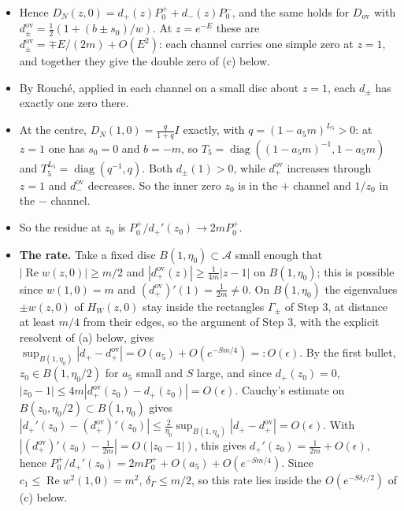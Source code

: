 \documentclass[11pt,a4paper]{article}
\begin{document}
\begin{itemize}
\begin{itemize}
\begin{itemize}
\begin{itemize}
\begin{equation*}
\adjustbox{max width=\linewidth}{$\displaystyle \gamma_0 D_N \gamma_0 = (P_- + P_+ T_5^{-L_5})(I + T_5^{-L_5})^{-1} = (P_- T_5^{L_5} + P_+)(T_5^{L_5} + I)^{-1} = D_N.$}
\end{equation*}

So $D_N(z, 0)$ commutes with $\gamma_0$.
\item{} Hence $D_N(z, 0) = d_+(z)P_0^+ + d_-(z)P_0^-$, and the same holds for $D_{\text{ov}}$ with $d_\pm^{\text{ov}} = \frac{1}{2}(1 + (b \pm s_0)/w)$. At $z = e^{-E}$ these are $d_\pm^{\text{ov}} = \mp E/(2m) + O(E^2)$: each channel carries one simple zero at $z = 1$, and together they give the double zero of (c) below.
\item{} By Rouch\'e, applied in each channel on a small disc about $z = 1$, each $d_\pm$ has exactly one zero there.
\item{} At the centre, $D_N(1, 0) = \frac{q}{1 + q}I$ exactly, with $q = (1 - a_5 m)^{L_5} > 0$: at $z = 1$ one has $s_0 = 0$ and $b = -m$, so $T_5 = \operatorname{diag}((1 - a_5 m)^{-1}, 1 - a_5 m)$ and $T_5^{L_5} = \operatorname{diag}(q^{-1}, q)$. Both $d_\pm(1) > 0$, while $d_+^{\text{ov}}$ increases through $z = 1$ and $d_-^{\text{ov}}$ decreases. So the inner zero $z_0$ is in the $+$ channel and $1/z_0$ in the $-$ channel.
\item{} So the residue at $z_0$ is $P_0^+/d_+'(z_0) \to 2m P_0^+$.
\item{} {\bfseries\boldmath The rate.} Take a fixed disc $B(1, \eta_0) \subset \mathcal{A}$ small enough that $|\operatorname{Re} w(z, 0)| \ge m/2$ and $|d_+^{\text{ov}}(z)| \ge \frac{1}{4m}|z - 1|$ on $B(1, \eta_0)$; this is possible since $w(1, 0) = m$ and $(d_+^{\text{ov}})'(1) = \frac{1}{2m} \ne 0$. On $B(1, \eta_0)$ the eigenvalues $\pm w(z, 0)$ of $H_W(z, 0)$ stay inside the rectangles $\Gamma_\pm$ of Step 3, at distance at least $m/4$ from their edges, so the argument of Step 3, with the explicit resolvent of (a) below, gives $\sup_{B(1, \eta_0)} |d_+ - d_+^{\text{ov}}| = O(a_5) + O(e^{-Sm/4}) =: O(\epsilon)$. By the first bullet, $z_0 \in B(1, \eta_0/2)$ for $a_5$ small and $S$ large, and since $d_+(z_0) = 0$, $|z_0 - 1| \le 4m|d_+^{\text{ov}}(z_0) - d_+(z_0)| = O(\epsilon)$. Cauchy's estimate on $B(z_0, \eta_0/2) \subset B(1, \eta_0)$ gives $|d_+'(z_0) - (d_+^{\text{ov}})'(z_0)| \le \frac{2}{\eta_0}\sup_{B(1, \eta_0)}|d_+ - d_+^{\text{ov}}| = O(\epsilon)$. With $|(d_+^{\text{ov}})'(z_0) - \frac{1}{2m}| = O(|z_0 - 1|)$, this gives $d_+'(z_0) = \frac{1}{2m} + O(\epsilon)$, hence $P_0^+/d_+'(z_0) = 2m P_0^+ + O(a_5) + O(e^{-Sm/4})$. Since $c_1 \le \operatorname{Re} w^2(1, 0) = m^2$, $\delta_\Gamma \le m/2$, so this rate lies inside the $O(e^{-S\delta_\Gamma/2})$ of (c) below.

\end{itemize}
\end{itemize}
\end{itemize}
\end{itemize}
\end{document}
